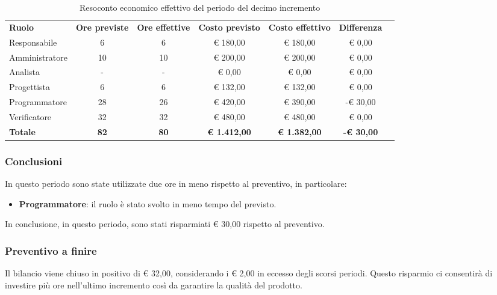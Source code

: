 \documentclass[../piano-di-progetto.tex]{subfiles}
\begin{document}
  \begin{table}[H]
    \centering
    \begin{tabular}{lcccccc}
      \rowcolor{lightgray}
      \textbf{Ruolo}  & \textbf{Ore previste} & \textbf{Ore effettive} & \textbf{Costo previsto} & \textbf{Costo effettivo} & \textbf{Differenza} \\
      Responsabile    & 6           & 6           & € 180,00            & € 180,00            & € 0,00            \\
Amministratore  & 10          & 10          & € 200,00            & € 200,00            & € 0,00            \\
Analista        & -           & -           & € 0,00              & € 0,00              & € 0,00            \\
Progettista     & 6           & 6           & € 132,00            & € 132,00            & € 0,00            \\
Programmatore   & 28          & 26          & € 420,00            & € 390,00            & -€ 30,00          \\
Verificatore    & 32          & 32          & € 480,00            & € 480,00            & € 0,00            \\
\textbf{Totale} & \textbf{82} & \textbf{80} & \textbf{€ 1.412,00} & \textbf{€ 1.382,00} & \textbf{-€ 30,00}

    \end{tabular}
    \caption{Resoconto economico effettivo del periodo del decimo incremento}
  \end{table}

\subsubsection{Conclusioni}
In questo periodo sono state utilizzate due ore in meno rispetto al preventivo, in particolare:
\begin{itemize}
    \item \textbf{Programmatore}: il ruolo è stato svolto in meno tempo del previsto.
\end{itemize}
In conclusione, in questo periodo, sono stati risparmiati € 30,00 rispetto al preventivo.

\subsubsection{Preventivo a finire}
Il bilancio viene chiuso in positivo di € 32,00, considerando i € 2,00 in eccesso degli scorsi periodi. Questo risparmio ci consentirà di investire più ore nell'ultimo incremento così da garantire la qualità del prodotto. 
\end{document}

